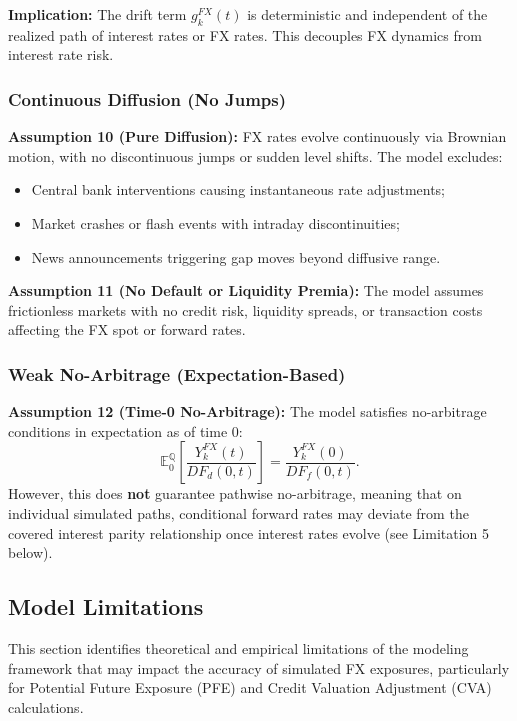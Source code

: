 \textbf{Implication:} The drift term $g_k^{FX}(t)$ is deterministic and independent of the realized path of interest rates or FX rates. This decouples FX dynamics from interest rate risk.

\subsubsection{Continuous Diffusion (No Jumps)}

\textbf{Assumption 10 (Pure Diffusion):} FX rates evolve continuously via Brownian motion, with no discontinuous jumps or sudden level shifts. The model excludes:
\begin{itemize}
	\item Central bank interventions causing instantaneous rate adjustments;
	\item Market crashes or flash events with intraday discontinuities;
	\item News announcements triggering gap moves beyond diffusive range.
\end{itemize}

\textbf{Assumption 11 (No Default or Liquidity Premia):} The model assumes frictionless markets with no credit risk, liquidity spreads, or transaction costs affecting the FX spot or forward rates.

\subsubsection{Weak No-Arbitrage (Expectation-Based)}

\textbf{Assumption 12 (Time-0 No-Arbitrage):} The model satisfies no-arbitrage conditions in expectation as of time 0:
\begin{equation}
	\mathbb{E}^{\mathbb{Q}}_0\left[\frac{Y_k^{FX}(t)}{DF_d(0,t)}\right] = \frac{Y_k^{FX}(0)}{DF_f(0,t)}.
\end{equation}
However, this does \textbf{not} guarantee pathwise no-arbitrage, meaning that on individual simulated paths, conditional forward rates may deviate from the covered interest parity relationship once interest rates evolve (see Limitation 5 below).

\subsection{Model Limitations}

This section identifies theoretical and empirical limitations of the modeling framework that may impact the accuracy of simulated FX exposures, particularly for Potential Future Exposure (PFE) and Credit Valuation Adjustment (CVA) calculations.

